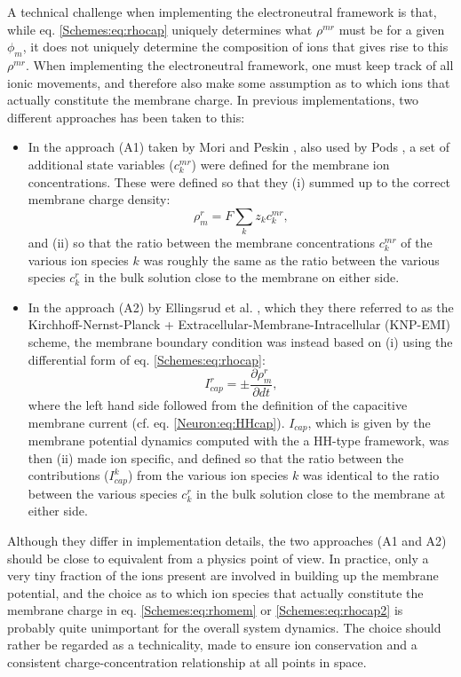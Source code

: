 A technical challenge when implementing the electroneutral framework is that, while eq. \ref{Schemes:eq:rhocap} uniquely determines what  $\rho^{mr}$ must be for a given $\phi_{m}$, it does not uniquely determine the composition of ions that gives rise to this  $\rho^{mr}$. When implementing the electroneutral framework, one must keep track of all ionic movements, and therefore also make some assumption as to which ions that actually constitute the membrane charge. In previous implementations, two different approaches has been taken to this:

\begin{itemize}

\item In the approach (A1) taken by Mori and Peskin \citep{Mori2006, Mori2009}, also used by Pods \citep{Pods2017}, a set of additional state variables ($c_k^{mr}$) were defined for the membrane ion concentrations. These were defined so that they (i) summed up to the correct membrane charge density: 
\begin{equation}
\rho_{m}^r = F \sum_k z_k c_k^{mr},
\label{Schemes:eq:rhomem}
\end{equation}
and (ii) so that the ratio between the membrane concentrations $c_k^{mr}$ of the various ion species $k$ was roughly the same as the ratio between the various species $c_k^r$ in the bulk solution close to the membrane on either side. 

\item In the approach (A2) by Ellingsrud et al. \citep{ellingsrud2020}, which they there referred to as the Kirchhoff-Nernst-Planck + Extracellular-Membrane-Intracellular (KNP-EMI) scheme, the membrane boundary condition was instead based on (i) using the differential form of eq. \ref{Schemes:eq:rhocap}:
\begin{equation}
I_{cap}^r = \pm \frac{\partial \rho_{m}^r}{\partial dt}, 
\label{Schemes:eq:rhocap2}
\end{equation}
where the left hand side followed from the definition of the capacitive membrane current (cf. eq. \ref{Neuron:eq:HHcap}). $I_{cap}$, which is given by the membrane potential dynamics computed with the a HH-type framework, was then (ii) made ion specific, and defined so that the ratio between the contributions ($I^k_{cap}$) from the various ion species $k$ was identical to the ratio between the various species $c_k^r$ in the bulk solution close to the membrane at either side.
\end{itemize}

Although they differ in implementation details, the two approaches (A1 and A2) should be close to equivalent from a physics point of view. In practice, only a very tiny fraction of the ions present are involved in building up the membrane potential, and the choice as to which ion species that actually constitute the membrane charge in eq. \ref{Schemes:eq:rhomem} or \ref{Schemes:eq:rhocap2} is probably quite unimportant for the overall system dynamics. The choice should rather be regarded as a technicality, made to ensure ion conservation and a consistent charge-concentration relationship at all points in space. 

